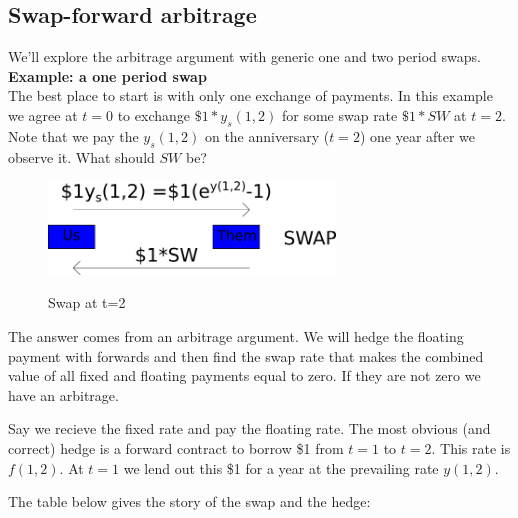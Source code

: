 \subsection{Swap-forward arbitrage}

We'll explore the arbitrage argument with generic one and two period swaps.\\

\textbf{Example: a one period swap}\\

The best place to start is with only one exchange of payments. In this example we agree at $t=0$ to exchange $\$1*y_s(1,2)$ for some swap rate $\$1*SW$ at $t=2$. Note that we pay the $y_s(1,2)$ on the anniversary ($t=2$) one year after we observe it. What should $SW$ be? 

\begin{figure}[htbp]
\begin{center}
  \includegraphics[width=3in]{pics/swap1P.png} \\
  \caption{Swap at t=2}
\label{swap1P}
\end{center}
\end{figure}

The answer comes from an arbitrage argument. We will hedge the floating payment with forwards and then find the swap rate that makes the combined value of all fixed and floating payments equal to zero. If they are not zero we have an arbitrage.

Say we recieve the fixed rate and pay the floating rate. The most obvious (and correct) hedge is a forward contract to borrow \$1 from $t=1$ to $t=2$. This rate is $f(1,2)$. At $t=1$ we lend out this \$1 for a year at the prevailing rate $y(1,2)$.

The table below gives the story of the swap and the hedge:

